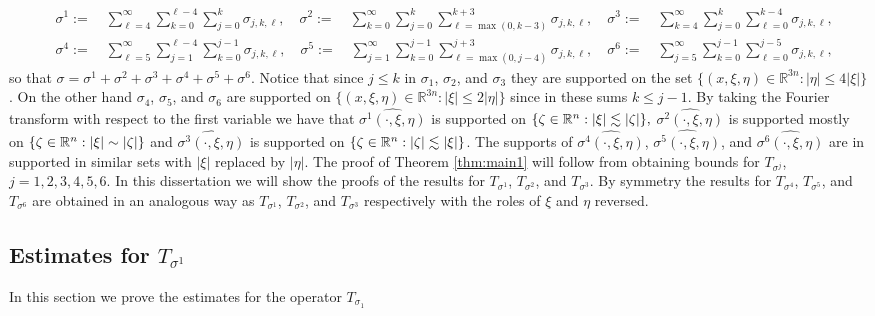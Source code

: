 \begin{align*}
& \sigma^1:= \quad \sum\limits_{\ell=4}^\infty \sum\limits_{k=0}^{\ell - 4} \sum\limits_{j =0}^{k} \sigma_{j,k,\ell}, \quad \sigma^2:= \quad \sum\limits_{k=0}^\infty \sum\limits_{j=0}^k \sum\limits_{\ell =\max(0,k-3)}^{k+3} \sigma_{j,k,\ell},\quad\sigma^3:= \quad \sum\limits_{k=4}^\infty \sum\limits_{j=0}^k \sum\limits_{\ell =0}^{k-4} \sigma_{j,k,\ell},\\
&\sigma^4:= \quad \sum\limits_{\ell=5}^\infty \sum\limits_{j=1}^{\ell - 4} \sum\limits_{k =0}^{j-1} \sigma_{j,k,\ell}, \quad \sigma^5:= \quad  \sum\limits_{j=1}^\infty \sum\limits_{k=0}^{j-1} \sum\limits_{\ell =\max(0,j-4)}^{j+3} \sigma_{j,k,\ell},\quad \sigma^6:= \quad \sum\limits_{j=5}^\infty \sum\limits_{k=0}^{j-1} \sum\limits_{\ell =0}^{j-5} \sigma_{j,k,\ell},
\end{align*}
so that $\sigma = \sigma^1+\sigma^2+\sigma^3+\sigma^4+\sigma^5+\sigma^6.$ Notice that since $j\leq k$ in $\sigma_1$, $\sigma_2$, and $\sigma_3$ they are supported on the set $\{(x,\xi,\eta) \in \mathbb{R}^{3n} : |\eta| \leq 4|\xi|\}$. On the other hand $\sigma_4$, $\sigma_5$, and $\sigma_6$ are supported on $\{(x,\xi,\eta) \in \mathbb{R}^{3n} : |\xi| \leq 2|\eta|\}$ since in these sums $k \leq j-1$. By taking the Fourier transform with respect to the first variable we have that $\widehat{\sigma^1(\cdot,\xi,\eta)}$ is supported on $\{\zeta\in{{\mathbb R}^n}: \left\vert \xi \right\vert\lesssim \left\vert \zeta \right\vert\},$
$\widehat{\sigma^2(\cdot,\xi,\eta)}$ is supported mostly on $\{\zeta\in{{\mathbb R}^n}: \left\vert \xi \right\vert\sim \left\vert \zeta \right\vert\}$ and $\widehat{\sigma^3(\cdot,\xi,\eta)}$ is supported on $\{\zeta\in{{\mathbb R}^n}: \left\vert \zeta \right\vert\lesssim \left\vert \xi \right\vert\}$. The supports of $\widehat{\sigma^4(\cdot,\xi,\eta)}$, $\widehat{\sigma^5(\cdot,\xi,\eta)}$, and $\widehat{\sigma^6(\cdot,\xi,\eta)}$ are in supported in similar sets with $|\xi|$ replaced by $|\eta|$. The proof of Theorem \ref{thm:main1} will follow from obtaining bounds for $T_{\sigma^j}$, $j=1,2,3,4,5,6$. In this dissertation we will show the proofs of the results for $T_{\sigma^1}$, $T_{\sigma^2}$, and $T_{\sigma^3}$. By symmetry the results for $T_{\sigma^4}$, $T_{\sigma^5}$, and $T_{\sigma^6}$ are obtained in an analogous way as $T_{\sigma^1}$, $T_{\sigma^2}$, and $T_{\sigma^3}$ respectively with the roles of $\xi$ and $\eta$ reversed.
\subsection{Estimates for $T_{\sigma^1}$}
In this section we prove the estimates for the operator $T_{\sigma_1}$

